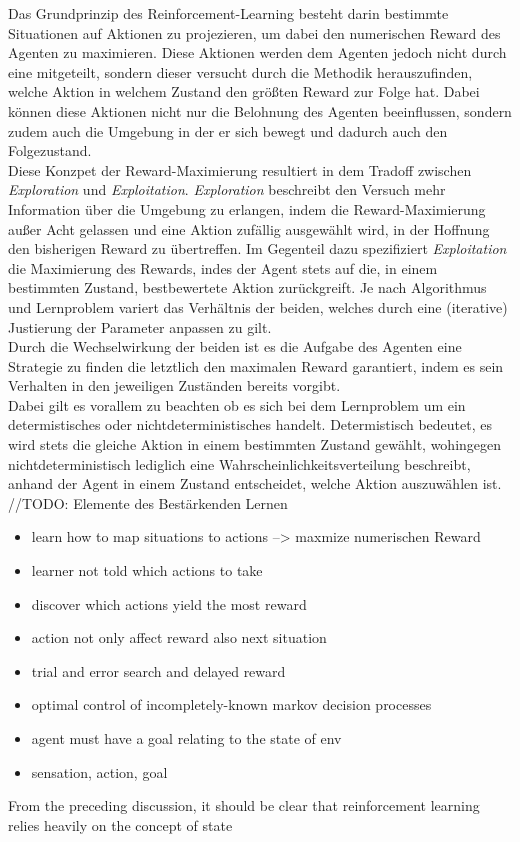 Das Grundprinzip des Reinforcement-Learning besteht darin bestimmte Situationen auf Aktionen zu projezieren, um dabei den numerischen Reward des Agenten zu maximieren. Diese Aktionen werden dem Agenten jedoch nicht durch eine  mitgeteilt, sondern dieser versucht durch die  Methodik herauszufinden, welche Aktion in welchem Zustand  den größten Reward zur Folge hat. Dabei können diese Aktionen nicht nur die Belohnung des Agenten beeinflussen, sondern zudem auch die Umgebung in der er sich bewegt und dadurch auch den Folgezustand. \\
Diese Konzpet der Reward-Maximierung resultiert in dem Tradoff zwischen \textit{Exploration} und \textit{Exploitation}. \textit{Exploration} beschreibt den Versuch mehr Information über die Umgebung zu erlangen, indem die Reward-Maximierung außer Acht gelassen und eine Aktion zufällig ausgewählt wird, in der Hoffnung den bisherigen Reward zu übertreffen. Im Gegenteil dazu spezifiziert \textit{Exploitation} die Maximierung des Rewards, indes der Agent stets auf die, in einem bestimmten Zustand, bestbewertete Aktion zurückgreift.
Je nach Algorithmus und Lernproblem variert das Verhältnis der beiden, welches durch eine (iterative) Justierung der Parameter anpassen zu gilt. \\
Durch die Wechselwirkung der beiden ist es die Aufgabe des Agenten eine Strategie zu finden die letztlich den maximalen Reward garantiert, indem es sein Verhalten in den jeweiligen Zuständen bereits vorgibt. \\
Dabei gilt es vorallem zu beachten ob es sich bei dem Lernproblem um ein determistisches oder nichtdeterministisches handelt. Determistisch bedeutet, es wird stets die gleiche Aktion in einem bestimmten Zustand gewählt, wohingegen nichtdeterministisch lediglich eine Wahrscheinlichkeitsverteilung beschreibt, anhand der Agent in einem Zustand entscheidet, welche Aktion auszuwählen ist. 
//TODO: Elemente des Bestärkenden Lernen
%
\begin{itemize}
    \item learn how to map situations to actions --> maxmize numerischen Reward
    \item learner not told which actions to take
    \item discover which actions yield the most reward
    \item action not only affect reward also next situation
    \item trial and error search and delayed reward
    
    \item optimal control of incompletely-known markov decision processes
    \item agent must have a goal relating to the state of env
    \item sensation, action, goal
\end{itemize}

From the preceding discussion, it should be clear that reinforcement learning relies heavily on the concept of state

